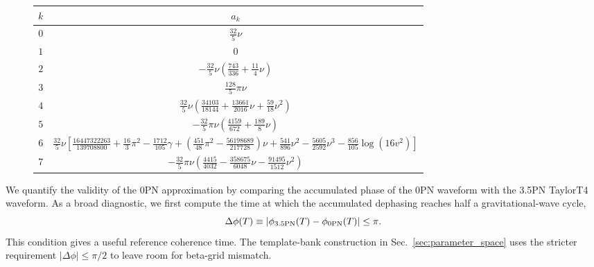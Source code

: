 \documentclass[aps,prd,amsmath,floats,floatfix, twocolumn,
superscriptaddress,nofootinbib,showpacs]{revtex4-2}
\begin{document}
\begin{figure}[t]
\centering
\begin{minipage}{\textwidth}
\begin{tabular}{|c|c|}
\hline
$k$ & $a_k$ \\ 
\hline 
$0$ &
$\displaystyle \frac{32}{5}\nu$ \rule{0pt}{3.5ex}
\\[1.2ex]

$1$ &
$\displaystyle 0$
\\[1.2ex]

$2$ &
$\displaystyle
-\frac{32}{5}\nu
\left(
\frac{743}{336}
+
\frac{11}{4}\nu
\right)$
\\[2ex]

$3$ &
$\displaystyle
\frac{128}{5}\pi\nu$
\\[2ex]

$4$ &
$\displaystyle
\frac{32}{5}\nu
\left(
\frac{34103}{18144}
+
\frac{13661}{2016}\nu
+
\frac{59}{18}\nu^2
\right)$
\\[2ex]

$5$ &
$\displaystyle
-\frac{32}{5}\pi\nu
\left(
\frac{4159}{672}
+
\frac{189}{8}\nu
\right)$
\\[2ex]

$6$ &
$\displaystyle
\frac{32}{5}\nu
\left[
\frac{16447322263}{139708800}
+
\frac{16}{3}\pi^2
-
\frac{1712}{105}\gamma
+
\left(
\frac{451}{48}\pi^2
-
\frac{56198689}{217728}
\right)\nu
+
\frac{541}{896}\nu^2
-
\frac{5605}{2592}\nu^3
-
\frac{856}{105}\log(16v^2)
\right]$
\\[3ex]

$7$ &
$\displaystyle
-\frac{32}{5}\pi\nu
\left(
\frac{4415}{4032}
-
\frac{358675}{6048}\nu
-
\frac{91495}{1512}\nu^2
\right)$
\\[2ex]
\hline
\end{tabular}
\end{minipage}
\label{table:dvdt-coefficients}
\end{figure}

We quantify the validity of the 0PN approximation by comparing the accumulated phase of the 0PN waveform with the 3.5PN TaylorT4 waveform.  As a broad diagnostic, we first compute the time at which the accumulated dephasing reaches half a gravitational-wave cycle,
\begin{equation}
    \Delta \phi(T)
    \equiv
    \left|
    \phi_{\rm 3.5PN}(T)-\phi_{\rm 0PN}(T)
    \right|
    \leq \pi .
    \label{eq:phase_validity}
\end{equation}
This condition gives a useful reference coherence time.  The template-bank construction in Sec.~\ref{sec:parameter_space} uses the stricter requirement $|\Delta\phi|\leq\pi/2$ to leave room for beta-grid mismatch.
\end{document}
